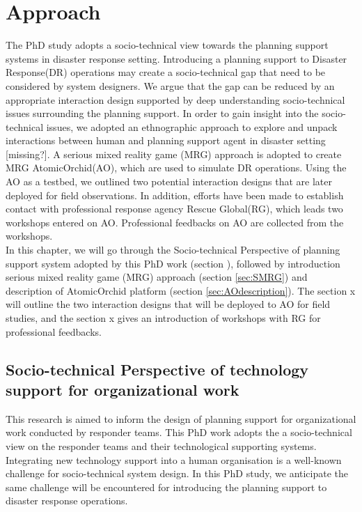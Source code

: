 \chapter{Approach}\label{ch:approach}
The PhD study adopts a socio-technical view towards the planning support systems in disaster response setting. Introducing a planning support to Disaster Response(DR) operations may create a socio-technical gap that need to be considered by system designers. We argue that the gap can be reduced by an appropriate interaction design supported by deep understanding socio-technical issues surrounding the planning support. In order to gain insight into the socio-technical issues, we adopted an ethnographic approach to explore and unpack interactions between human and planning support agent in disaster setting [missing?]. A serious mixed reality game (MRG) approach is adopted to create MRG AtomicOrchid(AO), which are used to simulate DR operations. Using the AO as a testbed, we outlined two potential interaction designs that are later deployed for field observations. In addition, efforts have been made to establish contact with professional response agency Rescue Global(RG), which leads two workshops entered on AO. Professional feedbacks on AO are collected from the workshops. \\

In this chapter, we will go through the Socio-technical Perspective of planning support system adopted by this PhD work (section ), followed by introduction serious mixed reality game (MRG) approach (section \ref{sec:SMRG}) and description of AtomicOrchid platform (section \ref{sec:AOdescription}). The section x will outline the two interaction designs that will be deployed to AO for field studies, and the section x gives an introduction of workshops with RG for professional feedbacks. \\


\section{Socio-technical Perspective of technology support for organizational work}\label{sec:sociotech}
This research is aimed to inform the design of planning support for organizational work conducted by responder teams. This PhD work adopts the a socio-technical view on the responder teams and their technological supporting systems. Integrating new technology support into a human organisation is a well-known challenge for socio-technical system design. In this PhD study, we anticipate the same challenge will be encountered for  introducing the planning support to disaster response operations.\\

